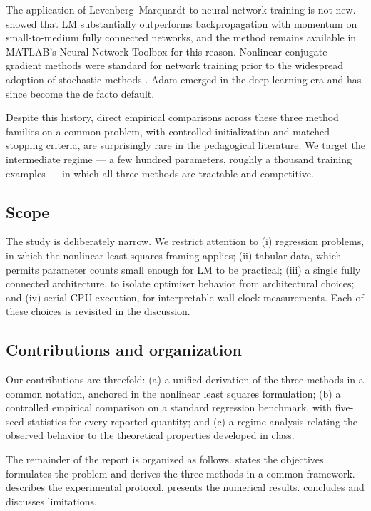 \documentclass[11pt,letterpaper]{article}
\theoremstyle{definition}
\begin{document}
The application of Levenberg--Marquardt to neural network training is not
new. \citet{HaganMenhaj1994} showed that LM substantially outperforms
backpropagation with momentum on small-to-medium fully connected networks,
and the method remains available in MATLAB's Neural Network Toolbox for
this reason. Nonlinear conjugate gradient methods were standard for
network training prior to the widespread adoption of stochastic methods
\citep{Moller1993}. Adam emerged in the deep learning era
\citep{KingmaBa2015} and has since become the de facto default.
 
Despite this history, direct empirical comparisons across these three
method families on a common problem, with controlled initialization and
matched stopping criteria, are surprisingly rare in the pedagogical
literature. We target the intermediate regime --- a few hundred parameters,
roughly a thousand training examples --- in which all three methods are
tractable and competitive.
 
\subsection{Scope}
 
The study is deliberately narrow. We restrict attention to (i) regression
problems, in which the nonlinear least squares framing applies; (ii)
tabular data, which permits parameter counts small enough for LM to be
practical; (iii) a single fully connected architecture, to isolate optimizer
behavior from architectural choices; and (iv) serial CPU execution, for
interpretable wall-clock measurements. Each of these choices is revisited
in the discussion.
 
\subsection{Contributions and organization}
 
Our contributions are threefold: (a) a unified derivation of the three
methods in a common notation, anchored in the nonlinear least squares
formulation; (b) a controlled empirical comparison on a standard regression
benchmark, with five-seed statistics for every reported quantity; and (c)
a regime analysis relating the observed behavior to the theoretical
properties developed in class.
 
The remainder of the report is organized as follows.
 states the objectives.
 formulates the problem and derives the three methods in
a common framework.
 describes the experimental protocol.
 presents the numerical results.
 concludes and discusses limitations.
 
\end{document}
